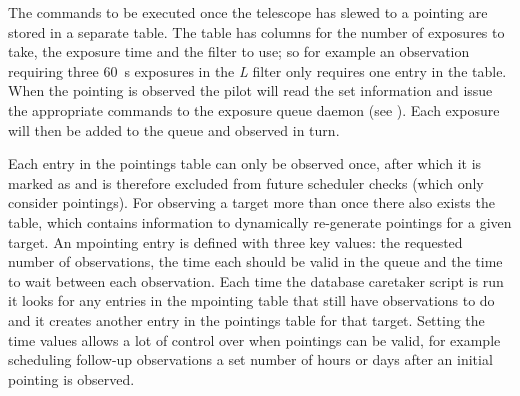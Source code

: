 \begin{colsection}
\begin{colsection}
The commands to be executed once the telescope has slewed to a pointing are stored in a separate  table. The table has columns for the number of exposures to take, the exposure time and the filter to use; so for example an observation requiring three \SI{60}{\second} exposures in the \textit{L} filter only requires one entry in the table. When the pointing is observed the pilot will read the set information and issue the appropriate commands to the exposure queue daemon (see ). Each exposure will then be added to the queue and observed in turn.

\newpage

Each entry in the pointings table can only be observed once, after which it is marked as  and is therefore excluded from future scheduler checks (which only consider  pointings). For observing a target more than once there also exists the  table, which contains information to dynamically re-generate pointings for a given target. An mpointing entry is defined with three key values: the requested number of observations, the time each should be valid in the queue and the time to wait between each observation. Each time the database caretaker script is run it looks for any entries in the mpointing table that still have observations to do and it creates another entry in the pointings table for that target. Setting the time values allows a lot of control over when pointings can be valid, for example scheduling follow-up observations a set number of hours or days after an initial pointing is observed.


\end{colsection}
\end{colsection}
